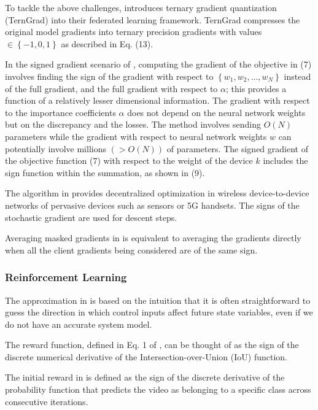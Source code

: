 \documentclass[11pt]{book}
\begin{document}
To tackle the above challenges, \cite{zhu2021distributed} introduces
ternary gradient quantization (TernGrad) into their federated learning
framework. TernGrad compresses the original model gradients into ternary
precision gradients with values $\in\left\{ -1,0,1\right\} $ as described
in Eq. (13).

In the signed gradient scenario of \cite{mahara2021multi}, computing
the gradient of the objective in (7) involves finding the sign of
the gradient with respect to $\left\{ w_{1},w_{2},\ldots,w_{N}\right\} $
instead of the full gradient, and the full gradient with respect to
$\alpha$; this provides a function of a relatively lesser dimensional
information. The gradient with respect to the importance coefficients
$\alpha$ does not depend on the neural network weights but on the
discrepancy and the losses. The method involves sending $O\left(N\right)$
parameters while the gradient with respect to neural network weights
$w$ can potentially involve millions $\left(>O\left(N\right)\right)$
of parameters. The signed gradient of the objective function (7) with
respect to the weight of the device $k$ includes the sign function
within the summation, as shown in (9).

The algorithm in \cite{phuong2021decentralized} provides decentralized
optimization in wireless device-to-device networks of pervasive devices
such as sensors or 5G handsets. The signs of the stochastic gradient
are used for descent steps.

Averaging masked gradients in \cite{tenison2021gradient} is equivalent
to averaging the gradients directly when all the client gradients
being considered are of the same sign.

\subsubsection{Reinforcement Learning}

The approximation in \cite{kolter2009policy} is based on the intuition
that it is often straightforward to guess the direction in which control
inputs affect future state variables, even if we do not have an accurate
system model.

The reward function, defined in Eq. 1 of \cite{kong2017collaborative},
can be thought of as the sign of the discrete numerical derivative
of the Intersection-over-Union (IoU) function.

The initial reward in \cite{tang2018deep} is defined as the sign
of the discrete derivative of the probability function that predicts
the video as belonging to a specific class across consecutive iterations.
\end{document}
